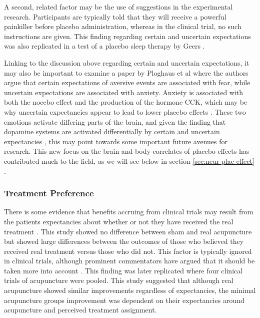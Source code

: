 A second, related factor may be the use of suggestions in the experimental research. Participants are typically told that they will receive a powerful painkiller before placebo administration, whereas in the clinical trial, no such instructions are given. This finding regarding certain and uncertain expectations was also replicated in a test of a placebo sleep therapy by Geers  \cite{Geers2005a}.

Linking to the discussion above regarding certain and uncertain expectations, it may also be important to examine a paper by Ploghaus et al \cite{Ploghaus2003} where the authors argue that certain expectations of aversive events are associated with fear, while uncertain expectations are associated with anxiety. Anxiety is associated with both the nocebo effect and the production of the hormone CCK, which may be why uncertain expectancies appear to lead to lower placebo effects \cite{Colloca2008b}. These two emotions activate differing parts of the brain, and given the finding that dopamine systems are activated differentially by certain and uncertain expectancies \cite{Scott2007a}, this may point towards some important future avenues for research. This new focus on the brain and body correlates of placebo effects has contributed much to the field, as we will see below in section \ref{sec:neur-plac-effect} .

\subsubsection{Treatment Preference}
\label{sec:treatment-preference}


There is some evidence that benefits accruing from clinical trials may result from the patients expectancies about whether or not they have received the real treatment \cite{Bausell2005}. This study showed no difference between sham and real acupuncture but showed large differences between the outcomes of those who believed they received real treatment versus those who did not. This factor is typically ignored in clinical trials, although prominent commentators have argued that it should be taken more into account \cite{Benedetti2007}. This finding was later replicated \cite{Linde2007}  where four clinical trials of acupuncture were pooled. This study suggested that although real acupuncture showed similar improvements regardless of expectancies, the minimal acupuncture groups improvement was dependent on their expectancies around acupuncture and perceived treatment assignment. 


